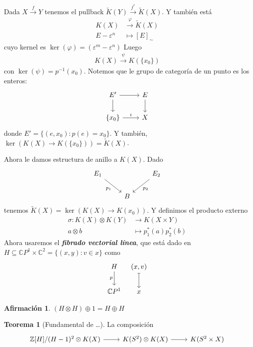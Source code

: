 \documentclass[spanish]{book}
\theoremstyle{definition}
\newtheorem*{teo}{Teorema}
\newtheorem*{af}{Afirmación}
\newcommand{\Z}{\mathbb{Z}}
\newcommand{\C}{\mathbb{C}}
\begin{document}
	Dada $X\overset{f}{\to}Y$ tenemos el pullback $\tilde{K}(Y)\overset{f^*}{\to}\tilde{K}(X)$. Y también está
	\begin{align*}
		K(X)&\overset{\varphi}{\to}\tilde{K}(X)\\
		E-\varepsilon^n&\mapsto [E]_\sim
	\end{align*}
	cuyo kernel es $\ker(\varphi)=(\varepsilon^m-\varepsilon^n)$
	Luego
	\begin{align*}
		K(X)\overset{\psi}{\to}K(\{x_0\})
	\end{align*}
	con $\ker(\psi)=p^{-1}(x_0)$. Notemos que le grupo de categoría de un punto es los enteros:
	\[\begin{tikzcd}
		E'\arrow[r]\arrow[d]&E\arrow[d]\\
		\{x_0\}\arrow[r,"i"]&X
	\end{tikzcd}\]
	donde $E'=\{(e,x_0):p(e)=x_0\}$. Y también, $\ker(K(X)\to K(\{x_0\}))=\tilde{K}(X)$.

Ahora le damos estructura de anillo a $K(X)$. Dado
	\[\begin{tikzcd}
	E_1\arrow[rd,swap,"p_1"]&&E_2\arrow[ld,"p_2"]\\
	&B
\end{tikzcd}\]
tenemos $\tilde{K}(X)=\ker(K(X)\to K(x_0))$. Y definimos el producto externo
\begin{align*}
	\sigma:K(X)\otimes K(Y)&\to K(X\times Y)\\
	a\otimes b&\mapsto p_1^*(a)p_2^*(b)
\end{align*}
Ahora usaremos el \textbf{\textit{fibrado vectorial línea}}, que está dado en $H\subseteq \C P^1\times \C^2=\{(x,y):v\in x\}$ como
\[\begin{tikzcd}[column sep=tiny]
	H\arrow[d,swap,"p"]&(x,v)\arrow[d,maps to]\\
	\C P^1&x
\end{tikzcd}\]
\begin{af}
	$(H\otimes H)\oplus1=H\oplus H$
\end{af}
\begin{teo}[Fundamental de …]
	La composición
	\[\begin{tikzcd}
			\Z[H]/(H-1)^2\otimes K(X)\arrow[r]&K(S^2)\otimes K(X)\arrow[r]&K(S^2\times X)
	\end{tikzcd}\]
\end{teo}
\end{document}
